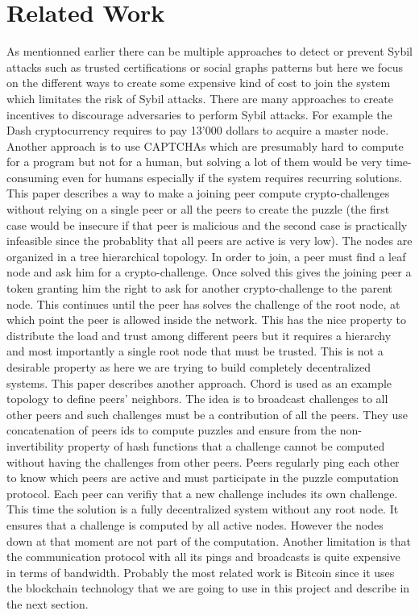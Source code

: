 \documentclass[twocolumn]{article}
\begin{document}
\section{Related Work}
As mentionned earlier there can be multiple approaches to detect or prevent Sybil attacks such as trusted certifications or social graphs patterns but here we focus on the different ways to create some expensive kind of cost to join the system which limitates the risk of Sybil attacks. There are many approaches to create incentives to discourage adversaries to perform Sybil attacks. For example the Dash cryptocurrency requires to pay 13’000 dollars to acquire a master node. Another approach is to use CAPTCHAs which are presumably hard to compute for a program but not for a human, but solving a lot of them would be very time-consuming even for humans especially if the system requires recurring solutions.
\linebreak
\linebreak
This paper\cite{sybil1} describes a way to make a joining peer compute crypto-challenges without relying on a single peer or all the peers to create the puzzle (the first case would be insecure if that peer is malicious and the second case is practically infeasible since the probablity that all peers are active is very low). The nodes are organized in a tree hierarchical topology. In order to join, a peer must find a leaf node and ask him for a crypto-challenge. Once solved this gives the joining peer a token granting him the right to ask for another crypto-challenge to the parent node. This continues until the peer has solves the challenge of the root node, at which point the peer is allowed inside the network. This has the nice property to distribute the load and trust among different peers but it requires a hierarchy and most importantly a single root node that must be trusted. This is not a desirable property as here we are trying to build completely decentralized systems.
\linebreak
\linebreak
This paper \cite{sybil2} describes another approach. Chord is used as an example topology to define peers’ neighbors. The idea is to broadcast challenges to all other peers and such challenges must be a contribution of all the peers. They use concatenation of peers ids to compute puzzles and ensure from the non-invertibility property of hash functions that a challenge cannot be computed without having the challenges from other peers. Peers regularly ping each other to know which peers are active and must participate in the puzzle computation protocol. Each peer can verifiy that a new challenge includes its own challenge. This time the solution is a fully decentralized system without any root node. It ensures that a challenge is computed by all active nodes. However the nodes down at that moment are not part of the computation. Another limitation is that the communication protocol with all its pings and broadcasts is quite expensive in terms of bandwidth.
\linebreak
\linebreak
Probably the most related work is Bitcoin since it uses the blockchain technology that we are going to use in this project and describe in the next section.
\end{document}
